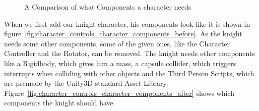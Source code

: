 \documentclass[12pt, a4paper, titlepage]{article}
\begin{document}
\begin{figure}[htbp]
  \begin{center}
    \hspace{0.5in}
  \end{center}
  \caption{A Comparison of what Components a character needs}
  \label{fig:character_controls_character_components}
\end{figure}

When we first add our knight character, his components look like it is shown in  figure~\ref{fig:character_controls_character_components_before}. As the knight needs some other components, some of the given ones, like the Character Controller and the Rotator, can be removed. The knight needs other components like a Rigidbody, which gives him a mass, a capsule collider, which triggers interrupts when colliding with other objects and the Third Person Scripts, which are premade by the Unity3D standard Asset Library. Figure~\ref{fig:character_controls_character_components_after} shows which components the knight should have.
\end{document}
